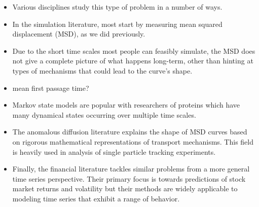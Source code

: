 \documentclass{article}
\begin{document}
  \begin{itemize}
  

    \item Various disciplines study this type of problem in a number of ways.
    \item In the simulation literature, most start by measuring mean squared 
    displacement (MSD), as we did previously.  %
    \item Due to the short time scales most people can feasibly simulate, the MSD 
    does not give a complete picture of what happens long-term, other than hinting
    at types of mechanisms that could lead to the curve's shape.
    \item mean first passage time?
    \item Markov state models are popular with researchers of proteins which have 
    many dynamical states occurring over multiple time scales.
    \item The anomalous diffusion literature explains the shape of MSD curves based
    on rigorous mathematical representations of transport mechanisms. This field is
    heavily used in analysis of single particle tracking experiments.
    \item Finally, the financial literature tackles similar problems from a more 
    general time series perspective. Their primary focus is towards predictions of
    stock market returns and volatility but their methods are widely applicable to
    modeling time series that exhibit a range of behavior.
  \end{itemize}
\end{document}
